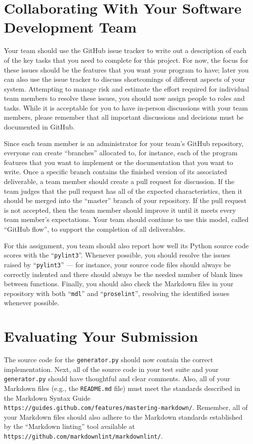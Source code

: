 \documentclass[11pt]{article}
\newcommand{\mainprogram}{\lstinline{generator.py}}
\newcommand{\reflection}{\lstinline{README.md}}
\newcommand{\command}[1]{``\lstinline{#1}''}
\newcommand{\url}[1]{\lstinline{#1}}
\newcommand{\step}[1]{``{#1}''}
\begin{document}
\section*{Collaborating With Your Software Development Team}

Your team should use the GitHub issue tracker to write out a description of each of the key tasks that you need to
complete for this project. For now, the focus for these issues should be the features that you want your program to
have; later you can also use the issue tracker to discuss shortcomings of different aspects of your system. Attempting
to manage risk and estimate the effort required for individual team members to resolve these issues, you should now
assign people to roles and tasks. While it is acceptable for you to have in-person discussions with your team members,
please remember that all important discussions and decisions must be documented in GitHub.

Since each team member is an administrator for your team's GitHub repository, everyone can create ``branches'' allocated
to, for instance, each of the program features that you want to implement or the documentation that you want to write.
Once a specific branch contains the finished version of its associated deliverable, a team member should create a pull
request for discussion. If the team judges that the pull request has all of the expected characteristics, then it should
be merged into the ``master'' branch of your repository. If the pull request is not accepted, then the team member
should improve it until it meets every team member's expectations. Your team should continue to use this model, called
``GitHub flow'', to support the completion of all deliverables.

For this assignment, you team should also report how well its Python source code scores with the \command{pylint3}.
Whenever possible, you should resolve the issues raised by \command{pylint3} --- for instance, your source code files
should always be correctly indented and there should always be the needed number of blank lines between functions.
Finally, you should also check the Markdown files in your repository with both \command{mdl} and \command{proselint},
resolving the identified issues whenever possible.

\section*{Evaluating Your Submission}

The source code for the \mainprogram{} should now contain the correct implementation. Next, all of the source code in
your test suite and your \mainprogram{} should have thoughtful and clear comments. Also, all of your Markdown files
(e.g., the \reflection{} file) must meet the standards described in the Markdown Syntax Guide
\url{https://guides.github.com/features/mastering-markdown/}. Remember, all of your Markdown files should also adhere to
the Markdown standards established by the \step{Markdown linting} tool available at
\url{https://github.com/markdownlint/markdownlint/}.
\end{document}
